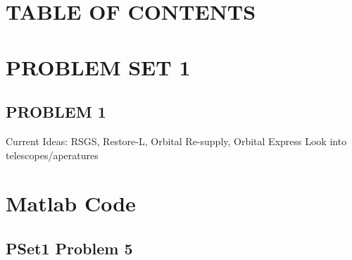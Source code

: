 \documentclass[12pt,a4paper,notitlepage]{article}
\begin{document}
\newpage
\section*{\Large TABLE OF CONTENTS}
\makeatletter
{}
\makeatother
\newpage


\section{\Large PROBLEM SET 1}
\subsection{PROBLEM 1}
Current Ideas:
RSGS, Restore-L, Orbital Re-supply, Orbital Express
Look into telescopes/aperatures

\newpage
\printbibliography

\newpage
\appendix
\addappheadtotoc
\Large{\bf{\appendixname}}
\section{Matlab Code}
\subsection{PSet1 Problem 5}\label{A:P1p5}


\end{document}
